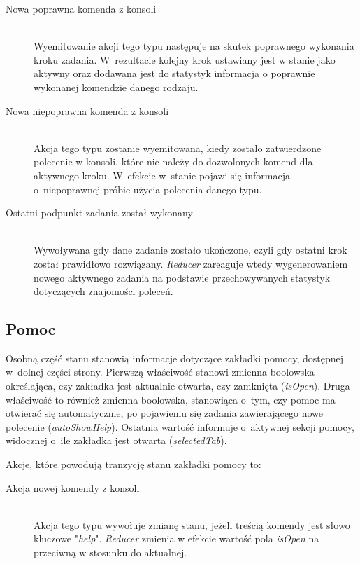 \documentclass[12pt,a4paper,polish,thesis]{dcsbook}
\begin{document}
{	\begin{description}
	\item[Nowa poprawna komenda z konsoli] \hfill \\
	Wyemitowanie akcji tego typu następuje na skutek poprawnego wykonania kroku zadania. W~rezultacie kolejny krok ustawiany jest w stanie jako aktywny oraz dodawana jest do statystyk informacja o poprawnie wykonanej komendzie danego rodzaju.
	\item[Nowa niepoprawna komenda z konsoli] \hfill \\
	Akcja tego typu zostanie wyemitowana, kiedy zostało zatwierdzone polecenie w konsoli, które nie należy do dozwolonych komend dla aktywnego kroku. W~efekcie w~stanie pojawi się informacja o~niepoprawnej próbie użycia polecenia danego typu.
	\item[Ostatni podpunkt zadania został wykonany] \hfill \\
	Wywoływana gdy dane zadanie zostało ukończone, czyli gdy ostatni krok został prawidłowo rozwiązany. \textit{Reducer} zareaguje wtedy wygenerowaniem nowego aktywnego zadania na podstawie przechowywanych statystyk dotyczących znajomości poleceń.
	\end{description}
		
	\subsection{Pomoc} \label{PomocStan}
	
	Osobną część stanu stanowią informacje dotyczące zakładki pomocy, dostępnej w~dolnej części strony. Pierwszą właściwość stanowi zmienna boolowska określająca, czy zakładka jest aktualnie otwarta, czy zamknięta (\textit{isOpen}). Druga właściwość to również zmienna boolowska, stanowiąca o~tym, czy pomoc ma otwierać się automatycznie, po pojawieniu się zadania zawierającego nowe polecenie (\textit{autoShowHelp}). Ostatnia wartość informuje o~aktywnej sekcji pomocy, widocznej o~ile zakładka jest otwarta (\textit{selectedTab}).
	
	Akcje, które powodują tranzycję stanu zakładki pomocy to:
	
	\begin{description}
	\item[Akcja nowej komendy z konsoli] \hfill \\
	Akcja tego typu wywołuje zmianę stanu, jeżeli treścią komendy jest słowo kluczowe "\textit{help}". \textit{Reducer} zmienia w efekcie wartość pola \textit{isOpen} na przeciwną w stosunku do aktualnej.
	

\end{description}}
\end{document}
